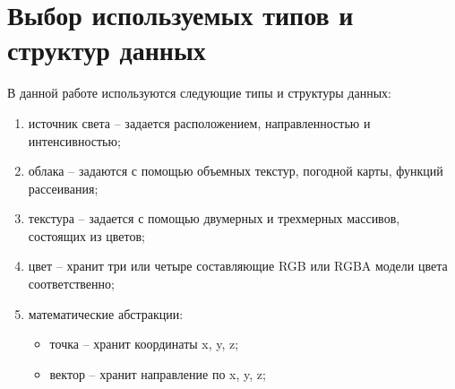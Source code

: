\newpage

\section{Выбор используемых типов и структур данных}

В данной работе используются следующие типы и структуры данных:
\begin{enumerate}
	\item источник света -- задается расположением, направленностью и интенсивностью;
	\item облака -- задаются с помощью объемных текстур, погодной карты, функций рассеивания;
	\item текстура -- задается с помощью двумерных и трехмерных массивов, состоящих из цветов;
	\item цвет -- хранит три или четыре составляющие RGB или RGBA модели цвета соответственно;
	\item математические абстракции: 
		\begin{itemize}
			\item точка -- хранит координаты x, y, z;
			\item вектор -- хранит направление по x, y, z;
		\end{itemize}
\end{enumerate}


